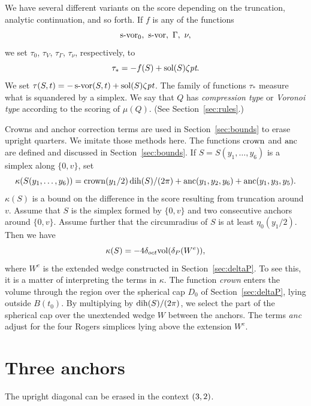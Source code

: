 We have several different variants on the score depending on the
truncation, analytic continuation, and so forth.  If $f$ is any of the
functions
    $$\svor_0,\ \svor,\ \Gamma, \ \nu,$$
we set $\tau_{0}$, $\tau_V$, $\tau_\Gamma$,
$\tau_\nu$, respectively,
to
    $$\tau_* = -f(S) +\operatorname{sol}(S)\zeta\hbox{\it pt}.$$
We set
    $\tau(S,t) = -\operatorname{s-vor}(S,t)+\operatorname{sol}(S)\zeta\hbox{\it pt}$.
The family of functions $\tau_*$ measure what is squandered by a
simplex.  We say that $Q$ has {\it compression type\/} or {\it
Voronoi type\/} according to the scoring of $\mu(Q)$.  (See
Section~\ref{sec:rules}.)

Crowns and anchor correction terms are used in Section~\ref{sec:bounds}
to erase upright quarters.  We imitate those methods here. The functions
$\operatorname{crown}$ and $\operatorname{anc}$ are defined and discussed in Section~\ref{sec:bounds}.
If
    $S=S(y_1,\ldots,y_6)$
is a simplex along $\{0,v\}$, set
    $$\kappa(S(y_1,\ldots,y_6))=\operatorname{crown}(y_1/2)\operatorname{dih}(S)/(2\pi) +
        \operatorname{anc}(y_1,y_2,y_6)+\operatorname{anc}(y_1,y_3,y_5).
    $$
$\kappa(S)$ is a bound on the difference in the score resulting from
truncation around $v$. Assume that $S$ is the simplex formed by $\{0,v\}$
and two consecutive anchors around $\{0,v\}$. Assume further that the
circumradius of $S$ is at least $\eta_0(y_1/2)$.  Then we have
    $$\kappa(S) = -4\delta_{oct} {\operatorname{vol}}(\delta_P(W^e)),$$
where $W^e$ is the extended wedge constructed in
Section~\ref{sec:deltaP}. To see this, it is a matter of interpreting
the terms in $\kappa$. The function {\it crown\/} enters the volume
through the region over the spherical cap $D_0$ of
Section~\ref{sec:deltaP}, lying outside $B(t_0)$.  By multiplying by
$\operatorname{dih}(S)/(2\pi)$, we select the part of the spherical cap over the
unextended wedge $W$ between the anchors.  The terms {\it anc\/} adjust
for the four Rogers simplices lying above the extension $W^e$.


\section{Three anchors}


\begin{lemma}
The upright diagonal can be erased in the context $\relax(3,2)$.
\end{lemma}


